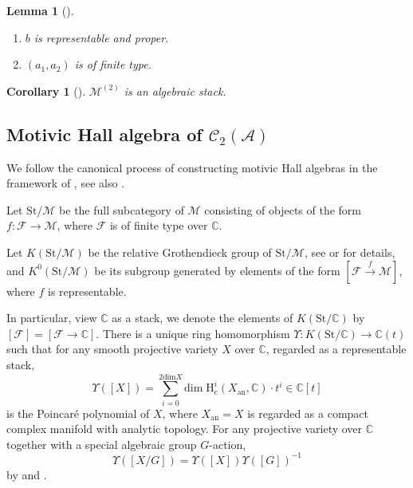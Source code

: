 \documentclass[12pt]{amsart}
\newtheorem{lemma}[theorem]{Lemma}
\newtheorem{corollary}[theorem]{Corollary}
\theoremstyle{definition}
\numberwithin{equation}{section}
\begin{document}
\begin{lemma}[{\itshape\cite[Lemma 4.1]{FLX24}}]\;

    \begin{enumerate}
        \item $ b $ is representable and proper.
        \item $ (a_1, a_2) $ is of finite type.
    \end{enumerate}
\end{lemma}

\begin{corollary}[{\itshape\cite[Corollary 4.2]{FLX24}}]\;

    $ \mathcal{M}^{(2)} $ is an algebraic stack.
\end{corollary}

\subsection{Motivic Hall algebra of \texorpdfstring{$ \mathcal{C}_2(\mathcal{A}) $}{C2A}}\;
\label{Motivic Hall algebra of C2A}

We follow the canonical process of constructing motivic Hall algebras in the framework of \cite{Joyce07}, see also \cite[Section 4.3, 4.4]{FLX24}.

Let $ \mathrm{St}/\mathcal{M} $ be the full subcategory of $ \mathcal{M} $ consisting of objects of the form $ f:\mathcal{F} \to \mathcal{M} $, where $ \mathcal{F} $ is of finite type over $ \mathbb{C} $.

Let $  K(\mathrm{St}/\mathcal{M}) $ be the relative Grothendieck group of $ \mathrm{St}/\mathcal{M} $, see \cite[Section 3.4]{Bridgeland12} or \cite[Section 4.3]{FLX24} for details, and 
$  K^0(\mathrm{St}/\mathcal{M}) $ be its subgroup generated by elements  of the form $ [\mathcal{F} \xrightarrow{f} \mathcal{M}] $, where $ f $ is representable.

In particular, view $ \mathbb{C} $ as a stack, we denote the elements of $  K(\mathrm{St}/\mathbb{C}) $ by $ [\mathcal{F}] = [\mathcal{F} \to \mathbb{C}] $.
There is a unique ring homomorphism $ \Upsilon: K(\mathrm{St}/\mathbb{C}) \to \mathbb{C}(t) $ such that for any smooth projective variety $ X $ over $ \mathbb{C} $, regarded as a representable stack, 
\[\Upsilon([X]) = \sum_{i=0}^{2\mathrm{dim}X} \mathrm{dim}\; \mathrm{H}^i_{\mathrm{c}}(X_{\mathrm{an}},\mathbb{C}) \cdot t^i \in \mathbb{C}[t]\]
is the Poincaré polynomial of $ X $, where $ X_{\mathrm{an}} = X $ is regarded as a compact complex manifold with analytic topology. 
For any projective variety over $ \mathbb{C} $ together with a special algebraic group $ G $-action,
\[\Upsilon([X/G])=\Upsilon([X])\Upsilon([G])^{-1}\] 
by \cite[Example 2.12, Theorem 2.14]{Joyce07} and \cite[Section 5.3]{Bridgeland17}.
\end{document}
